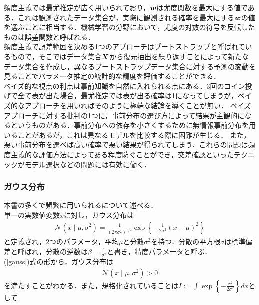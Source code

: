 \documentclass[a4j,11pt]{jsarticle}
\newcommand{\bw}{\mbox{\boldmath {$w$}}}
\newcommand{\bX}{\mbox{\boldmath {$X$}}}
\numberwithin{equation}{section}
\begin{document}
頻度主義では最尤推定が広く用いられており，$\bw$は尤度関数を最大にする値である．これは観測されたデータ集合が，実際に観測される確率を最大にする$\bw$の値を選ぶことに相当する．機械学習の分野において，尤度の対数の符号を反転したものは誤差関数と呼ばれる．\\

頻度主義で誤差範囲を決める1つのアプローチはブートストラップと呼ばれているもので，そこではデータ集合$\bX$から復元抽出を繰り返すことによって新たなデータ集合を作成し，異なるブートストラップデータ集合に対する予測の変動を見ることでパラメータ推定の統計的な精度を評価することができる．\\

ベイズ的な視点の利点は事前知識を自然に入れられる点にある．3回のコイン投げで全て表が出た場合，最尤推定では表が出る確率は1になってしまうが，ベイズ的なアプローチを用いればそのように極端な結論を導くことが無い．
ベイズアプローチに対する批判の1つに，事前分布の選び方によって結果が主観的になるというものがある．事前分布への依存を小さくするために無情報事前分布を用いることがあるが，これは異なるモデルを比較する際に困難が生じる．%
また，悪い事前分布を選べば高い確率で悪い結果が得られてしまう．これらの問題は頻度主義的な評価方法によってある程度防ぐことができ，交差確認といったテクニックがモデル選択などの問題には有効に働く．\\

\subsubsection{ガウス分布}
本書の多くで頻繁に用いられるについて述べる．\\
単一の実数値変数$x$に対し，ガウス分布は
\begin{align}
\label{gauss}
\mathcal{N}(x\mid \mu,\sigma^2) = \frac{1}{(2\pi\sigma^2)^{1/2}}\exp\left\{-\frac{1}{2\sigma^2}(x-\mu)^2\right\}
\end{align}
と定義され，2つのパラメータ，平均$\mu$と分散$\sigma^2$を持つ．分散の平方根$\sigma$は標準偏差と呼ばれ，分散の逆数は$\beta = \frac{1}{\sigma^2}$と書き，精度パラメータと呼ぶ．\\
(\ref{gauss})式の形から，ガウス分布は
\begin{align}
\mathcal{N}(x\mid \mu,\sigma^2)>0
\end{align}
を満たすことがわかる．また，規格化されていることは$I := \displaystyle\int \exp\left\{-\frac{x^2}{2\sigma^2}\right\}dx$として
\end{document}
